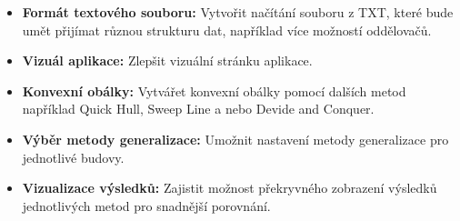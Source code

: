 \begin{itemize}
    \item \textbf{Formát textového souboru:} Vytvořit načítání souboru z TXT, které bude umět přijímat různou strukturu dat, například více možností oddělovačů.

    \item \textbf{Vizuál aplikace:} Zlepšit vizuální stránku aplikace.

    \item \textbf{Konvexní obálky:} Vytvářet konvexní obálky pomocí dalších metod například Quick Hull, Sweep Line a nebo Devide and Conquer.

    \item \textbf{Výběr metody generalizace:} Umožnit nastavení metody generalizace pro jednotlivé budovy.

    \item \textbf{Vizualizace výsledků:} Zajistit možnost překryvného zobrazení výsledků jednotlivých metod pro snadnější porovnání.


\end{itemize}
